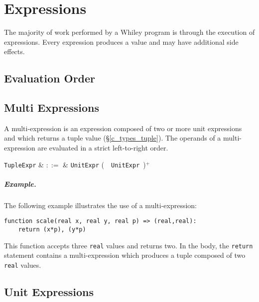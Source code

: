 \chapter{Expressions}
The majority of work performed by a Whiley program is through the execution of \glspl{expression}.  Every expression produces a \gls{value} and may have additional side effects.

\section{Evaluation Order}


\section{Multi Expressions}
\label{c_expr_tuple}
A multi-expression is an expression composed of two or more unit expressions and which returns a tuple value (\S\ref{c_types_tuple}).  The operands of a multi-expression are evaluated in a strict left-to-right order.

\begin{syntax}
  \verb+TupleExpr+ & $::=$ & \verb+UnitExpr+ \big(\ \token{,}\ \verb+UnitExpr+\ \big)$^+$ \\
\end{syntax}

\paragraph{Example.}  The following example illustrates the use of a multi-expression:

\begin{lstlisting}
function scale(real x, real y, real p) => (real,real):
    return (x*p), (y*p)
\end{lstlisting}

This function accepts three \lstinline{real} values and returns two.  In the body, the \lstinline{return} statement contains a multi-expression which produces a tuple composed of two \lstinline{real} values.


\section{Unit Expressions}
\label{c_expr_unit}

